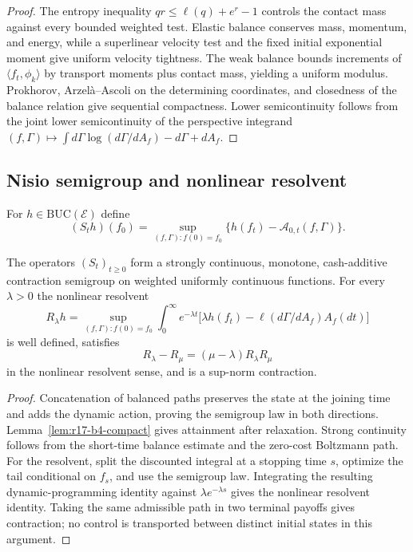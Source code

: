 \begin{proof}
The entropy inequality
$q r\le \ell(q)+e^r-1$ controls the contact mass against every bounded
weighted test.  Elastic balance conserves mass, momentum, and energy, while a
superlinear velocity test and the fixed initial exponential moment give
uniform velocity tightness.  The weak balance bounds increments of
$\langle f_t,\phi_k\rangle$ by transport moments plus contact mass, yielding a
uniform modulus.  Prokhorov, Arzelà--Ascoli on the determining coordinates,
and closedness of the balance relation give sequential compactness.  Lower
semicontinuity follows from the joint lower semicontinuity of the perspective
integrand $(f,\Gamma)\mapsto\int
d\Gamma\log(d\Gamma/dA_f)-d\Gamma+dA_f$.
\end{proof}

\subsection{Nisio semigroup and nonlinear resolvent}

For $h\in\mathrm{BUC}(\mathcal E)$ define
\[
 (S_t h)(f_0)=
 \sup_{(f,\Gamma):f(0)=f_0}
 \{h(f_t)-\mathcal A_{0,t}(f,\Gamma)\}.
\]

\begin{theorem}
\label{thm:r17-b4-nisio}
The operators $(S_t)_{t\ge0}$ form a strongly continuous, monotone,
cash-additive contraction semigroup on weighted uniformly continuous
functions.  For every $\lambda>0$ the nonlinear resolvent
\[
 R_\lambda h=
 \sup_{(f,\Gamma):f(0)=f_0}
 \int_0^\infty e^{-\lambda t}
 \bigl[\lambda h(f_t)-
  \ell(d\Gamma/dA_f)A_f(dt)\bigr]
\]
is well defined, satisfies
\[
 R_\lambda-R_\mu
 =(\mu-\lambda)R_\lambda R_\mu
\]
in the nonlinear resolvent sense, and is a sup-norm contraction.
\end{theorem}

\begin{proof}
Concatenation of balanced paths preserves the state at the joining time and
adds the dynamic action, proving the semigroup law in both directions.
Lemma~\ref{lem:r17-b4-compact} gives attainment after relaxation.  Strong
continuity follows from the short-time balance estimate and the zero-cost
Boltzmann path.  For the resolvent, split the discounted integral at a stopping
time $s$, optimize the tail conditional on $f_s$, and use the semigroup law.
Integrating the resulting dynamic-programming identity against
$\lambda e^{-\lambda s}$ gives the nonlinear resolvent identity.  Taking the
same admissible path in two terminal payoffs gives contraction; no control is
transported between distinct initial states in this argument.
\end{proof}

